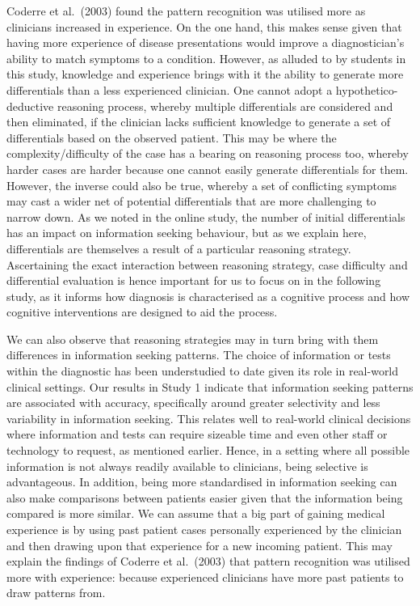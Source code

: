 \documentclass[a4paper, nobind]{templates/ociamthesis}
\begin{document}
Coderre et al.~(2003) found the pattern recognition was utilised more as clinicians increased in experience. On the one hand, this makes sense given that having more experience of disease presentations would improve a diagnostician's ability to match symptoms to a condition. However, as alluded to by students in this study, knowledge and experience brings with it the ability to generate more differentials than a less experienced clinician. One cannot adopt a hypothetico-deductive reasoning process, whereby multiple differentials are considered and then eliminated, if the clinician lacks sufficient knowledge to generate a set of differentials based on the observed patient. This may be where the complexity/difficulty of the case has a bearing on reasoning process too, whereby harder cases are harder because one cannot easily generate differentials for them. However, the inverse could also be true, whereby a set of conflicting symptoms may cast a wider net of potential differentials that are more challenging to narrow down. As we noted in the online study, the number of initial differentials has an impact on information seeking behaviour, but as we explain here, differentials are themselves a result of a particular reasoning strategy. Ascertaining the exact interaction between reasoning strategy, case difficulty and differential evaluation is hence important for us to focus on in the following study, as it informs how diagnosis is characterised as a cognitive process and how cognitive interventions are designed to aid the process.

We can also observe that reasoning strategies may in turn bring with them differences in information seeking patterns. The choice of information or tests within the diagnostic has been understudied to date given its role in real-world clinical settings. Our results in Study 1 indicate that information seeking patterns are associated with accuracy, specifically around greater selectivity and less variability in information seeking. This relates well to real-world clinical decisions where information and tests can require sizeable time and even other staff or technology to request, as mentioned earlier. Hence, in a setting where all possible information is not always readily available to clinicians, being selective is advantageous. In addition, being more standardised in information seeking can also make comparisons between patients easier given that the information being compared is more similar. We can assume that a big part of gaining medical experience is by using past patient cases personally experienced by the clinician and then drawing upon that experience for a new incoming patient. This may explain the findings of Coderre et al.~(2003) that pattern recognition was utilised more with experience: because experienced clinicians have more past patients to draw patterns from.
\end{document}
